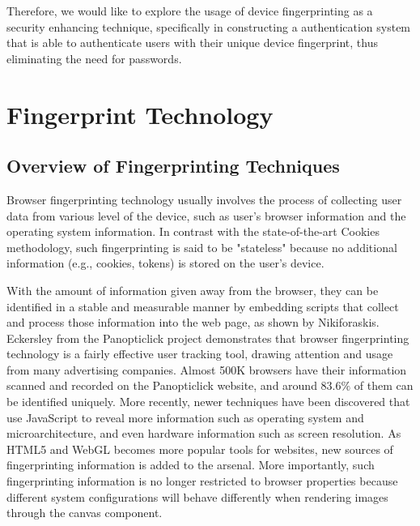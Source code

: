 \documentclass{acm_proc_article-sp}
\begin{document}
Therefore, we would like to explore the usage of device fingerprinting as a security enhancing technique, specifically in constructing a authentication system that is able to authenticate users with their unique device fingerprint, thus eliminating the need for passwords.


\section{Fingerprint Technology}

\subsection{Overview of  Fingerprinting Techniques}
Browser fingerprinting technology usually involves the process of collecting user data from various level of the device, such as user's browser information and the operating system information. \cite{pierre:beauty}
In contrast with the state-of-the-art Cookies methodology, such fingerprinting is said to be "stateless" because no additional information (e.g., cookies, tokens) is stored on the user's device. 

With the amount of information given away from the browser, they can be identified in a stable and measurable manner \cite{niki:cookie} by embedding scripts that collect and process those information into the web page, as shown by Nikiforaskis. 
Eckersley from the Panopticlick project \cite{panop} demonstrates that browser fingerprinting technology is a fairly effective user tracking tool, drawing attention and usage from many advertising companies. Almost 500K browsers have their information scanned and recorded on the Panopticlick website, and around $83.6\%$ of them can be identified uniquely.
More recently, newer techniques have been discovered that use JavaScript to reveal more information such as operating system and microarchitecture, and even hardware information such as screen resolution. \cite{mowery:fg} \cite{boda:user}
As HTML5 and WebGL becomes more popular tools for websites, new sources of fingerprinting information is added to the arsenal. More importantly, such fingerprinting information is no longer restricted to browser properties because different system configurations will behave differently when rendering images through the canvas component.\cite{mowery:pixel}
\end{document}
